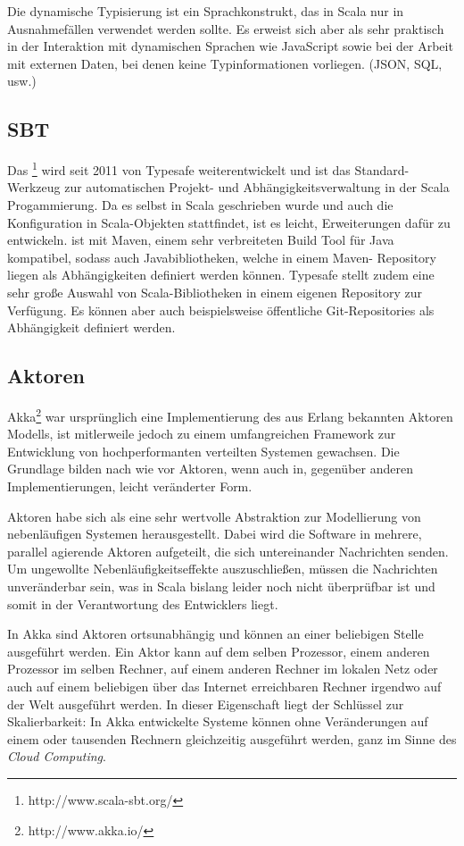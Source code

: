Die dynamische Typisierung ist ein Sprachkonstrukt, das in Scala nur in Ausnahmefällen verwendet
werden sollte. Es erweist sich aber als sehr praktisch in der Interaktion mit dynamischen Sprachen
wie JavaScript sowie bei der Arbeit mit externen Daten, bei denen keine Typinformationen vorliegen.
(JSON, SQL, usw.)

\subsection{SBT}
\label{sec:sbt}

Das \footnote{http://www.scala-sbt.org/} wird seit 2011 von Typesafe weiterentwickelt und
ist das Standard-Werkzeug zur automatischen Projekt- und Abhängigkeitsverwaltung in der Scala
Progammierung. Da es selbst in Scala geschrieben wurde und auch die Konfiguration in Scala-Objekten
stattfindet, ist es leicht, Erweiterungen dafür zu entwickeln.  ist mit Maven, einem sehr
verbreiteten Build Tool für Java kompatibel, sodass auch Javabibliotheken, welche in einem Maven-
Repository liegen als Abhängigkeiten definiert werden können. Typesafe stellt zudem eine sehr große
Auswahl von Scala-Bibliotheken in einem eigenen Repository zur Verfügung. Es können aber auch
beispielsweise öffentliche Git-Repositories als Abhängigkeit definiert werden.

\subsection{Aktoren}
\label{sec:akka}

Akka\footnote{http://www.akka.io/} war ursprünglich eine Implementierung des aus Erlang bekannten
Aktoren Modells, ist mitlerweile jedoch zu einem umfangreichen Framework zur Entwicklung von
hochperformanten verteilten Systemen gewachsen. Die Grundlage bilden nach wie vor Aktoren, wenn auch
in, gegenüber anderen Implementierungen, leicht veränderter Form. \cite{actors}

Aktoren habe sich als eine sehr wertvolle Abstraktion zur Modellierung von nebenläufigen Systemen
herausgestellt. Dabei wird die Software in mehrere, parallel agierende Aktoren aufgeteilt, die
sich untereinander Nachrichten senden. Um ungewollte Nebenläufigkeitseffekte auszuschließen, müssen
die Nachrichten unveränderbar sein, was in Scala bislang leider noch nicht überprüfbar ist und somit
in der Verantwortung des Entwicklers liegt.

In Akka sind Aktoren ortsunabhängig und können an einer beliebigen Stelle ausgeführt werden. Ein
Aktor kann auf dem selben Prozessor, einem anderen Prozessor im selben Rechner, auf einem anderen
Rechner im lokalen Netz oder auch auf einem beliebigen über das Internet erreichbaren Rechner
irgendwo auf der Welt ausgeführt werden. In dieser Eigenschaft liegt der Schlüssel zur
Skalierbarkeit: In Akka entwickelte Systeme können ohne Veränderungen auf einem oder tausenden
Rechnern gleichzeitig ausgeführt werden, ganz im Sinne des \textit{Cloud Computing}.

